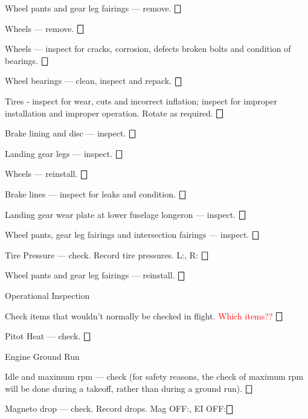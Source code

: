 \begin{enumerate*}
\begin{enumerate*}
\begin{enumerate*}
	  \end{enumerate*}
		\item Wheel pants and gear leg fairings --- remove.  \dotfill $\bigbox$
		\item Wheels --- remove. \dotfill $\bigbox$
		\item Wheels --- inspect for cracks, corrosion, defects broken bolts and condition of bearings. \dotfill $\bigbox$
		\item Wheel bearings --- clean, inspect and repack. \dotfill $\bigbox$
		\item Tires - inspect for wear, cuts and incorrect inflation; inspect for improper installation and improper operation.  Rotate as required. \dotfill $\bigbox$
		\item Brake lining and disc --- inspect. \dotfill $\bigbox$
		\item Landing gear legs --- inspect. \dotfill $\bigbox$
		\item Wheels --- reinstall.  \dotfill $\bigbox$
		\item Brake lines --- inspect for leaks and condition. \dotfill $\bigbox$
		\item Landing gear wear plate at lower fuselage longeron --- inspect. \dotfill $\bigbox$
		\item Wheel pants, gear leg fairings and intersection fairings ---  inspect. \dotfill $\bigbox$
		\item Tire Pressure --- check. Record tire pressures. L:\underline{\makebox[0.5in][l]{}}, R:\underline{\makebox[0.5in][l]{}}  \dotfill $\bigbox$
		\item Wheel pants and gear leg fairings --- reinstall.  \dotfill $\bigbox$
	\end{enumerate*}
	\item{Operational Inspection} 
	\begin{enumerate*}
		\item Check items that wouldn't normally be checked in flight. \textcolor{red}{Which items??}  \dotfill $\bigbox$
		\item Pitot Heat --- check. \dotfill $\bigbox$
	\end{enumerate*}
	\item{Engine Ground Run}
	\begin{enumerate*}
		\item Idle and maximum rpm --- check (for safety reasons, the check of maximum rpm will be done during a takeoff, rather than during a ground run). \dotfill $\bigbox$
		\item Magneto drop --- check. Record drops. Mag OFF:\underline{\makebox[0.5in][l]{}}, EI OFF:\underline{\makebox[0.5in][l]{}}\dotfill $\bigbox$

\end{enumerate*}
\end{enumerate*}
